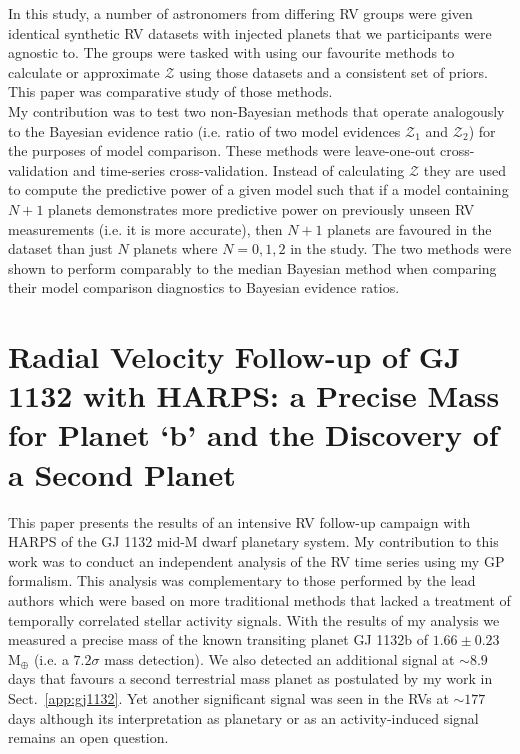 In this study, a number of astronomers from differing RV groups were given
identical synthetic RV datasets with injected planets that we participants were
agnostic to. The groups were 
tasked with using our favourite methods to calculate or approximate
$\mathcal{Z}$ using those datasets and a consistent set of priors. This paper
was comparative study of those methods. \\

My contribution was to test two non-Bayesian methods that operate
analogously to the Bayesian evidence ratio (i.e. ratio of two model evidences
$\mathcal{Z}_1$ and $\mathcal{Z}_2$) for the purposes of model comparison. These
methods were leave-one-out cross-validation and time-series cross-validation.
Instead of calculating $\mathcal{Z}$ they are used to compute the
predictive power of a given model such that if a model containing $N+1$ planets
demonstrates more predictive power on previously unseen RV measurements
(i.e. it is more accurate), then $N+1$ planets are favoured in the dataset
than just $N$ planets where $N=0,1,2$ in the study.
The two methods were shown to perform comparably to
the median Bayesian method when comparing their model comparison diagnostics
to Bayesian evidence ratios.

\section{Radial Velocity Follow-up of GJ 1132 with HARPS: a Precise Mass for
  Planet `b' and the Discovery of a Second Planet \citep{bonfils18}}
\label{sect:gj1132bonfils}
This paper presents the results of an intensive RV follow-up campaign with HARPS
of the GJ 1132 mid-M dwarf
planetary system. My contribution to this work was to conduct an
independent analysis of the RV time series using my GP formalism. This analysis
was complementary to those performed by the lead authors which were based on more
traditional methods that lacked a treatment of temporally correlated stellar
activity signals. With the results of my analysis we measured a precise mass of
the known transiting planet GJ 1132b of $1.66\pm 0.23$ M$_{\oplus}$ (i.e. a
$7.2\sigma$ mass detection). We also detected an additional signal at $\sim 8.9$
days that favours a second terrestrial mass planet as postulated by my work in
Sect.~\ref{app:gj1132}. Yet another significant signal was seen in the RVs at
$\sim 177$ days although its interpretation as planetary or as an
activity-induced signal remains an open question.


